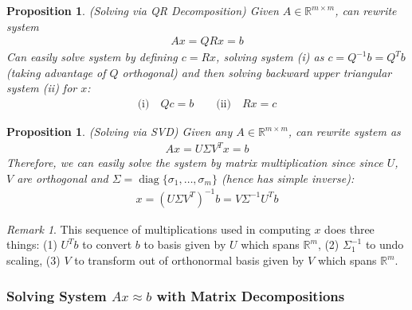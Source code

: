 \documentclass[12pt]{article}
\numberwithin{equation}{section} %
\theoremstyle{plain}
\newtheorem{prop}[thm]{Proposition}
\theoremstyle{definition}
\theoremstyle{remark}
\newtheorem*{rmk}{Remark}
\newcommand{\diag}{\operatorname{diag}}
\newcommand{\Rm}{\mathbb{R}^m}
\newcommand{\Rmm}{\mathbb{R}^{m\times m}}
\begin{document}
\begin{prop}\emph{(Solving via QR Decomposition)}
Given $A\in\Rmm$, can rewrite system
\begin{align*}
  Ax = QRx = b
\end{align*}
Can easily solve system by defining $c=Rx$,
solving system (i) as $c=Q^{-1}b=Q^Tb$ (taking advantage of
$Q$ orthogonal) and then solving backward upper triangular system
(ii) for $x$:
\begin{align*}
  \text{(i)}\quad
  Qc = b
  \qquad
  \text{(ii)}\quad
  Rx = c
\end{align*}
\end{prop}

\begin{prop}
\emph{(Solving via SVD)}
Given any $A\in\Rmm$, can rewrite system as
\begin{align*}
  Ax
  = U\Sigma V^Tx
  = b
\end{align*}
Therefore, we can easily solve the system by matrix multiplication
since since $U$, $V$ are orthogonal and
$\Sigma=\diag\{\sigma_1,\ldots,\sigma_m\}$ (hence has simple inverse):
\begin{align*}
  x
  = (U\Sigma V^T)^{-1}b
  = V\Sigma^{-1}U^Tb
\end{align*}
\end{prop}
\begin{rmk}
This sequence of multiplications used in computing $x$ does three
things:
(1) $U^Tb$ to convert $b$ to basis given by $U$ which spans $\Rm$, (2)
$\Sigma_1^{-1}$ to undo scaling, (3) $V$ to transform out of orthonormal
basis given by $V$ which spans $\Rm$.
\end{rmk}


\clearpage
\subsubsection{Solving System $Ax\approx b$ with Matrix Decompositions}
\end{document}
